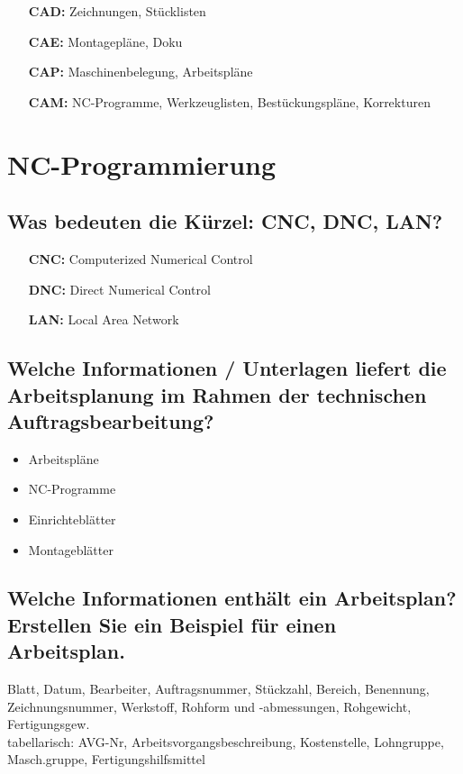 \begin{itemize}
\item[\textbf{CAD:}] Zeichnungen, Stücklisten
\item[\textbf{CAE:}] Montagepläne, Doku
\item[\textbf{CAP:}] Maschinenbelegung, Arbeitspläne
\item[\textbf{CAM:}] NC-Programme, Werkzeuglisten, Bestückungspläne, Korrekturen
\end{itemize}


\newpage

\section{NC-Programmierung}


\subsection*{Was bedeuten die Kürzel: CNC, DNC, LAN?}

\begin{itemize}
\item[\textbf{CNC:}] Computerized Numerical Control
\item[\textbf{DNC:}] Direct Numerical Control
\item[\textbf{LAN:}] Local Area Network
\end{itemize}


\subsection*{Welche Informationen / Unterlagen liefert die Arbeitsplanung im Rahmen der technischen Auftragsbearbeitung?}

\begin{itemize}
\item Arbeitspläne
\item NC-Programme
\item Einrichteblätter
\item Montageblätter
\end{itemize}


\subsection*{Welche Informationen enthält ein Arbeitsplan? Erstellen Sie ein Beispiel für einen Arbeitsplan.}

Blatt, Datum, Bearbeiter, Auftragsnummer, Stückzahl, Bereich, Benennung, Zeichnungsnummer, Werkstoff, Rohform und -abmessungen, Rohgewicht, Fertigungsgew. \\
tabellarisch: AVG-Nr, Arbeitsvorgangsbeschreibung, Kostenstelle, Lohngruppe, Masch.gruppe, 
Fertigungshilfsmittel

